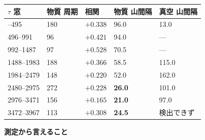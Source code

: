 \documentclass[
  10pt,
]{ltjsarticle}
\newcounter{none} %
\begin{document}
{\def\LTcaptype{none} %
\begin{longtable}[]{@{}lllll@{}}
\toprule\noalign{}
\(\tau\) 窓 & 物質 周期 & 相関 & 物質 山間隔 & 真空 山間隔 \\
\midrule\noalign{}
\endhead
\bottomrule\noalign{}
\endlastfoot
0--495 & 180 & \(+0.338\) & 96.0 & 13.0 \\
496--991 & 96 & \(+0.421\) & 94.0 & --- \\
992--1487 & 97 & \(+0.528\) & 70.5 & --- \\
1488--1983 & 188 & \(+0.366\) & 58.5 & 115.0 \\
1984--2479 & 148 & \(+0.220\) & 52.0 & 162.0 \\
2480--2975 & 272 & \(+0.228\) & \textbf{26.0} & 101.0 \\
2976--3471 & 156 & \(+0.165\) & \textbf{21.0} & 97.0 \\
3472--3967 & 113 & \(+0.308\) & \textbf{24.5} & 検出できず \\
\end{longtable}
}

\textbf{測定から言えること}
\end{document}
